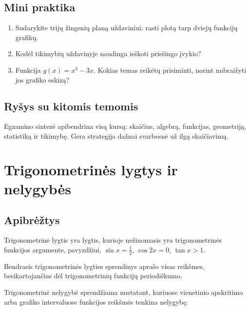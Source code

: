 \subsection{Mini praktika}
\begin{enumerate}[label=\alph*)]
\item Sudarykite trijų žingsnių planą uždaviniui: rasti plotą tarp dviejų funkcijų grafikų.
\item Kodėl tikimybių uždavinyje naudinga ieškoti priešingo įvykio?
\item Funkcija \(g(x)=x^3-3x\). Kokias temas reikėtų prisiminti, norint nubraižyti jos grafiko eskizą?
\end{enumerate}

\subsection{Ryšys su kitomis temomis}
Egzamino sintezė apibendrina visą kursą: skaičius, algebrą, funkcijas, geometriją, statistiką ir tikimybę. Gera strategija dažnai svarbesnė už ilgą skaičiavimą.

\section{Trigonometrinės lygtys ir nelygybės}\label{sec:trigonometrines-lygtys-ir-nelygybes}

\subsection{Apibrėžtys}
\begin{apibreztis}
Trigonometrinė lygtis yra lygtis, kurioje nežinomasis yra trigonometrinės funkcijos argumente, pavyzdžiui, \(\sin x=\frac12\), \(\cos 2x=0\), \(\tan x>1\).
\end{apibreztis}
\begin{apibreztis}
Bendrasis trigonometrinės lygties sprendinys aprašo visas reikšmes, besikartojančias dėl trigonometrinių funkcijų periodiškumo.
\end{apibreztis}
\begin{apibreztis}
Trigonometrinė nelygybė sprendžiama nustatant, kuriuose vienetinio apskritimo arba grafiko intervaluose funkcijos reikšmės tenkina nelygybę.
\end{apibreztis}

